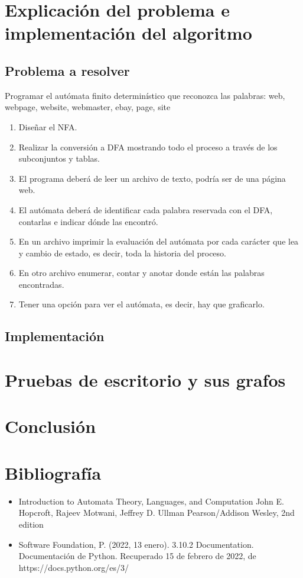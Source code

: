 \documentclass{article}
\begin{document}
\section{Explicaci\'on del problema e implementaci\'on del algoritmo}

\subsection{Problema a resolver}

Programar el autómata finito determinístico que reconozca las palabras: web, webpage, website, webmaster, ebay, page, site
\begin{enumerate}
    \item Diseñar el NFA.
    \item Realizar la conversión a DFA mostrando todo el proceso a través de los subconjuntos y tablas.
    \item El programa deberá de leer un archivo de texto, podría ser de una página web.
    \item El autómata deberá de identificar cada palabra reservada con el DFA, contarlas e indicar dónde las encontró.
    \item  En un archivo imprimir la evaluación del autómata por cada carácter que lea y cambio de estado, es decir, toda la historia del proceso.
    \item En otro archivo enumerar, contar y anotar donde están las palabras encontradas.
    \item Tener una opción para ver el autómata, es decir, hay que graficarlo.
\end{enumerate}

\subsection{Implementaci\'on}


\section{Pruebas de escritorio y sus grafos}


\section{Conclusi\'on}


\section{Bibliograf\'ia}
\begin{itemize}
    \item Introduction to Automata Theory, Languages, and Computation
John E. Hopcroft, Rajeev Motwani, Jeffrey D. Ullman
Pearson/Addison Wesley, 2nd edition
    \item Software Foundation, P. (2022, 13 enero). 3.10.2 Documentation. Documentación de Python. Recuperado 15 de febrero de 2022, de https://docs.python.org/es/3/
\end{itemize}
\end{document}
